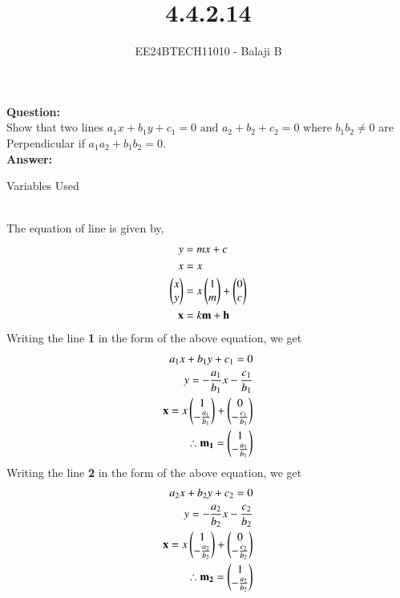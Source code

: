 \documentclass[journal]{IEEEtran}
\begin{document}

\vspace{3cm}

\title{4.4.2.14}
\author{EE24BTECH11010 - Balaji B}
{\let\newpage\relax\maketitle}
\textbf{Question:}\\
Show that two lines $a_1x+b_1y+c_1 = 0 \text{ and } a_2+b_2+c_2=0 \text{ where } b_1b_2 \neq 0$ are Perpendicular if $a_1a_2 + b_1b_2 = 0.$\\
\textbf{Answer:}\\
\begin{table}[h!]    
  \centering
  
  \caption{Variables Used}
  \label{tab1-1.9-6}
  \end{table}\\
The equation of line is given by,
\begin{align}
    y &= mx + c \\
    x &= x\\
    \begin{pmatrix}x \\ y\end{pmatrix} &= x\begin{pmatrix}1 \\ m\end{pmatrix} + \begin{pmatrix}0\\c\end{pmatrix}\\
    \mathbf{x} &= k\mathbf{m} + \mathbf{h}
\end{align}
Writing the line \textbf{1} in the form of the above equation, we get
\begin{align}
    a_1x+b_1y+c_1 = 0\\
    y = -\frac{a_1}{b_1} x -\frac{c_1}{b_1}\\
    \mathbf{x} = x\begin{pmatrix}1 \\ -\frac{a_1}{b_1}\end{pmatrix} + \begin{pmatrix}0 \\ -\frac{c_1}{b_1}\end{pmatrix}\\
\therefore \mathbf{m_1} = \begin{pmatrix}1\\-\frac{a_1}{b_1}\end{pmatrix}
\end{align}
Writing the line \textbf{2} in the form of the above equation, we get
\begin{align}
    a_2x+b_2y+c_2 = 0\\
    y = -\frac{a_2}{b_2} x -\frac{c_2}{b_2}\\
    \mathbf{x} = x\begin{pmatrix}1 \\ -\frac{a_2}{b_2}\end{pmatrix} + \begin{pmatrix}0 \\ -\frac{c_2}{b_2}\end{pmatrix}\\
\therefore \mathbf{m_2} = \begin{pmatrix}1\\-\frac{a_2}{b_2}\end{pmatrix}
\end{align}
\end{document}
